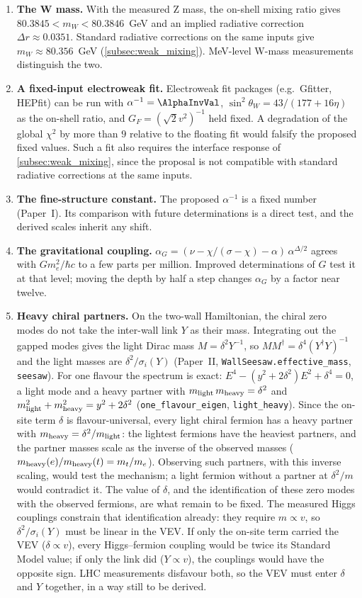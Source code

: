 \begin{enumerate}
    \item \textbf{The W mass.} With the measured Z mass, the on-shell mixing ratio gives $80.3845<m_W<80.3846$~GeV and an implied radiative correction $\Delta r\approx0.0351$. Standard radiative corrections on the same inputs give $m_W\approx80.356$~GeV (\cref{subsec:weak_mixing}). MeV-level W-mass measurements distinguish the two.
    \item \textbf{A fixed-input electroweak fit.} Electroweak fit packages (e.g.\ Gfitter, HEPfit) can be run with $\alpha^{-1}=\AlphaInvVal$, $\sin^2\theta_W=43/(177+16\eta)$ as the on-shell ratio, and $G_F=(\sqrt2v^2)^{-1}$ held fixed. A degradation of the global $\chi^2$ by more than $9$ relative to the floating fit would falsify the proposed fixed values. Such a fit also requires the interface response of \cref{subsec:weak_mixing}, since the proposal is not compatible with standard radiative corrections at the same inputs.
    \item \textbf{The fine-structure constant.} The proposed $\alpha^{-1}$ is a fixed number (Paper~I). Its comparison with future determinations is a direct test, and the derived scales inherit any shift.
    \item \textbf{The gravitational coupling.} $\alpha_G=(\nu-\chi/(\sigma-\chi)-\alpha)\,\alpha^{\Delta/2}$ agrees with $Gm_e^2/\hbar c$ to a few parts per million. Improved determinations of $G$ test it at that level; moving the depth by half a step changes $\alpha_G$ by a factor near twelve.
    \item \textbf{Heavy chiral partners.} On the two-wall Hamiltonian, the chiral zero modes do not take the inter-wall link $Y$ as their mass. Integrating out the gapped modes gives the light Dirac mass $M=\delta^2Y^{-1}$, so $MM^\dagger=\delta^4(Y^\dagger Y)^{-1}$ and the light masses are $\delta^2/\sigma_i(Y)$ (Paper~II, \texttt{WallSeesaw.effective\_mass}, \texttt{seesaw}). For one flavour the spectrum is exact: $E^4-(y^2+2\delta^2)E^2+\delta^4=0$, a light mode and a heavy partner with $m_{\rm light}\,m_{\rm heavy}=\delta^2$ and $m_{\rm light}^2+m_{\rm heavy}^2=y^2+2\delta^2$ (\texttt{one\_flavour\_eigen}, \texttt{light\_heavy}). Since the on-site term $\delta$ is flavour-universal, every light chiral fermion has a heavy partner with $m_{\rm heavy}=\delta^2/m_{\rm light}$: the lightest fermions have the heaviest partners, and the partner masses scale as the inverse of the observed masses ($m_{\rm heavy}(e)/m_{\rm heavy}(t)=m_t/m_e$). Observing such partners, with this inverse scaling, would test the mechanism; a light fermion without a partner at $\delta^2/m$ would contradict it. The value of $\delta$, and the identification of these zero modes with the observed fermions, are what remain to be fixed. The measured Higgs couplings constrain that identification already: they require $m\propto v$, so $\delta^2/\sigma_i(Y)$ must be linear in the VEV. If only the on-site term carried the VEV ($\delta\propto v$), every Higgs--fermion coupling would be twice its Standard Model value; if only the link did ($Y\propto v$), the couplings would have the opposite sign. LHC measurements disfavour both, so the VEV must enter $\delta$ and $Y$ together, in a way still to be derived.

\end{enumerate}
